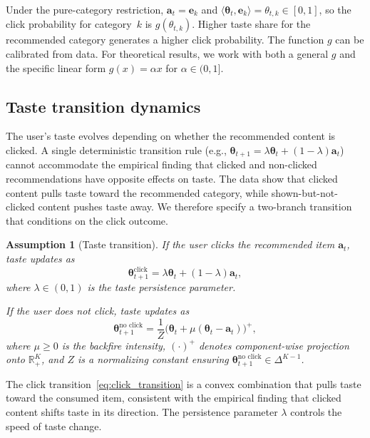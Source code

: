 \documentclass[11pt]{article}
\newtheorem{assumption}{Assumption}
\newcommand{\R}{\mathbb{R}}
\begin{document}
Under the pure-category restriction, $\mathbf{a}_t = \mathbf{e}_k$ and $\langle \boldsymbol{\theta}_t, \mathbf{e}_k \rangle = \theta_{t,k} \in [0,1]$, so the click probability for category~$k$ is $g(\theta_{t,k})$. Higher taste share for the recommended category generates a higher click probability. The function $g$ can be calibrated from data. For theoretical results, we work with both a general $g$ and the specific linear form $g(x) = \alpha x$ for $\alpha \in (0, 1]$.

\subsection{Taste transition dynamics}

The user's taste evolves depending on whether the recommended content is clicked. A single deterministic transition rule (e.g., $\boldsymbol{\theta}_{t+1} = \lambda \boldsymbol{\theta}_t + (1-\lambda) \mathbf{a}_t$) cannot accommodate the empirical finding that clicked and non-clicked recommendations have opposite effects on taste. The data show that clicked content pulls taste toward the recommended category, while shown-but-not-clicked content pushes taste away. We therefore specify a two-branch transition that conditions on the click outcome.

\begin{assumption}[Taste transition]\label{as:transition}
If the user \emph{clicks} the recommended item $\mathbf{a}_t$, taste updates as
\begin{equation}\label{eq:click_transition}
\boldsymbol{\theta}_{t+1}^{\text{click}} = \lambda \boldsymbol{\theta}_t + (1 - \lambda) \mathbf{a}_t,
\end{equation}
where $\lambda \in (0,1)$ is the taste persistence parameter.

If the user does \emph{not click}, taste updates as
\begin{equation}\label{eq:noclick_transition}
\boldsymbol{\theta}_{t+1}^{\text{no click}} = \frac{1}{Z}\bigl(\boldsymbol{\theta}_t + \mu(\boldsymbol{\theta}_t - \mathbf{a}_t)\bigr)^{+},
\end{equation}
where $\mu \ge 0$ is the backfire intensity, $(\cdot)^{+}$ denotes component-wise projection onto $\R_+^K$, and $Z$ is a normalizing constant ensuring $\boldsymbol{\theta}_{t+1}^{\text{no click}} \in \Delta^{K-1}$.
\end{assumption}

The click transition~\eqref{eq:click_transition} is a convex combination that pulls taste toward the consumed item, consistent with the empirical finding that clicked content shifts taste in its direction. The persistence parameter $\lambda$ controls the speed of taste change.
\end{document}
